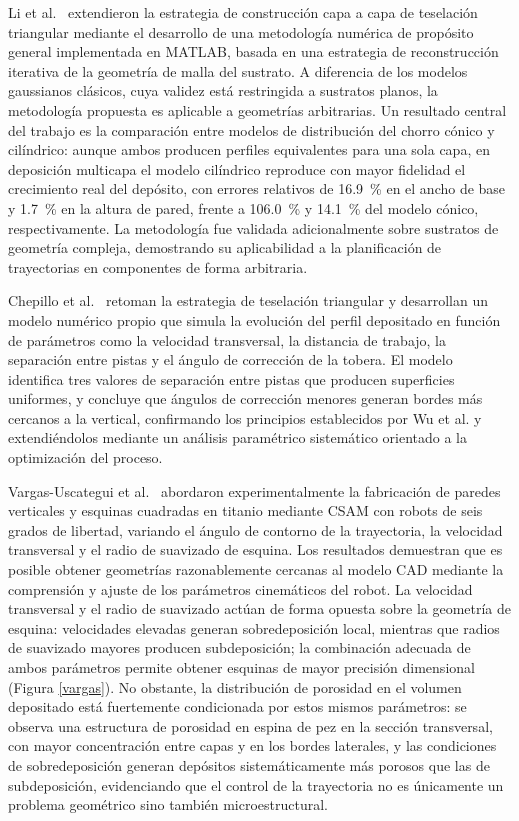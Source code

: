 Li et al.~\cite{Li2023mesh} extendieron la estrategia de construcción 
capa a capa de teselación triangular mediante el 
desarrollo de una metodología numérica de propósito general implementada 
en MATLAB, basada en una estrategia de reconstrucción iterativa de la 
geometría de malla del sustrato. A diferencia de los modelos gaussianos 
clásicos, cuya validez está restringida a sustratos planos, la metodología 
propuesta es aplicable a geometrías arbitrarias. Un resultado central del 
trabajo es la comparación entre modelos de distribución del chorro cónico 
y cilíndrico: aunque ambos producen perfiles equivalentes para una sola 
capa, en deposición multicapa el modelo cilíndrico reproduce con mayor 
fidelidad el crecimiento real del depósito, con errores relativos de 
\SI{16.9}{\percent} en el ancho de base y \SI{1.7}{\percent} en la altura 
de pared, frente a \SI{106.0}{\percent} y \SI{14.1}{\percent} del modelo 
cónico, respectivamente. La metodología fue validada adicionalmente sobre 
sustratos de geometría compleja, demostrando su aplicabilidad a la 
planificación de trayectorias en componentes de forma arbitraria.

Chepillo et al.~\cite{Chepillo2024} retoman la estrategia de teselación triangular y desarrollan un modelo 
numérico propio que simula la evolución del perfil depositado en función 
de parámetros como la velocidad transversal, la distancia de trabajo, la 
separación entre pistas y el ángulo de corrección de la tobera. El modelo 
identifica tres valores de separación entre pistas que producen superficies 
uniformes, y concluye que ángulos de corrección menores generan bordes más 
cercanos a la vertical, confirmando los principios establecidos por Wu et 
al. y extendiéndolos mediante un análisis paramétrico sistemático orientado 
a la optimización del proceso.

Vargas-Uscategui et al.~\cite{VargasUscategui2021} abordaron 
experimentalmente la fabricación de paredes verticales y esquinas 
cuadradas en titanio mediante CSAM con robots de seis grados de libertad, 
variando el ángulo de contorno de la trayectoria, la velocidad transversal 
y el radio de suavizado de esquina. Los resultados demuestran que es posible 
obtener geometrías razonablemente cercanas al modelo CAD mediante la 
comprensión y ajuste de los parámetros cinemáticos del robot. La velocidad 
transversal y el radio de suavizado actúan de forma opuesta sobre la 
geometría de esquina: velocidades elevadas generan sobredeposición local, 
mientras que radios de suavizado mayores producen subdeposición; la 
combinación adecuada de ambos parámetros permite obtener esquinas de 
mayor precisión dimensional (Figura \ref{vargas}). No obstante, la distribución de porosidad 
en el volumen depositado está fuertemente condicionada por estos mismos 
parámetros: se observa una estructura de porosidad en espina de pez en 
la sección transversal, con mayor concentración entre capas y en los 
bordes laterales, y las condiciones de sobredeposición generan depósitos 
sistemáticamente más porosos que las de subdeposición, evidenciando que 
el control de la trayectoria no es únicamente un problema geométrico 
sino también microestructural.

